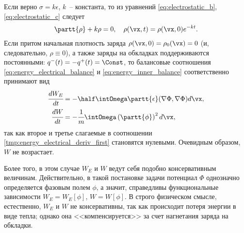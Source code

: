 \begin{remark}
\label{rem:charge_constant}
Если верно $\sigma = k\epsilon$, $k$~-- константа, то из уравнений \eqref{eq:electrostatic_b}, \eqref{eq:electrostatic_c} следует
\[
    \partt{\rho} + k \rho = 0, \quad \rho(\vx, t) = \rho(\vx, 0) e^{-kt}.
\]
Если притом начальная плотность заряда $\rho(\vx, 0) = \rho_0(\vx) = 0$ (и, следовательно, $\rho \equiv 0$), а также заряды на обкладках поддерживаются постоянными: $q^-(t) = -q^+(t) = \Const$, то балансовые соотношения \eqref{eq:energy_electrical_balance} и \eqref{eq:energy_inner_balance} соответственно принимают вид
\begin{align*}
    \cfrac{d W_E}{dt} & = -\half \intOmega \partt{\epsilon} (\nabla \Phi, \nabla \Phi) d \vx, \\
    \cfrac{dW}{dt} & = -\cfrac{1}{m} \intOmega \left( \partt{\phi} \right)^2 d \vx,
\end{align*}
так как второе и третье слагаемые в соотношении \eqref{tmp:energy_electrical_deriv_first} становятся нулевыми. Очевидным образом, $W$ не возрастает.

Более того, в этом случае $W_E$ и $W$ ведут себя подобно консервативным величинам. Действительно, в такой постановке задачи потенциал $\Phi$ однозначно определяется фазовым полем $\phi$, а значит, справедливы функциональные зависимости $W_E = W_E[\phi]$, $W = W[\phi]$. В строго физическом смысле, естественно, $W_E$ и $W$ не консервативны, так как происходит потеря энергии в виде тепла; однако она <<компенсируется>> за счет нагнетания заряда на обкладки.
\end{remark}